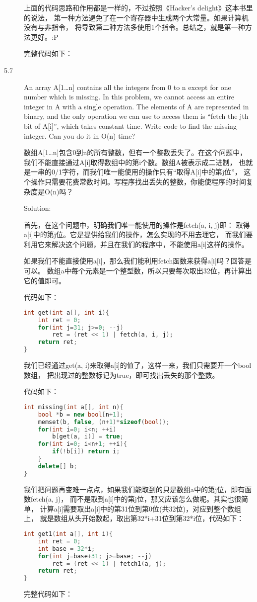 \begin{description}
上面的代码思路和作用都是一样的，不过按照《Hacker’s delight》这本书里的说法， 第一种方法避免了在一个寄存器中生成两个大常量。如果计算机没有与非指令， 将导致第二种方法多使用1个指令。总结之，就是第一种方法更好。:P

完整代码如下：



\item[5.7] An array A[1…n] contains all the integers from 0 to n except for one number which is missing. In this problem, we cannot access an entire integer in A with a single operation. The elements of A are represented in binary, and the only operation we can use to access them is “fetch the jth bit of A[i]”, which takes constant time. Write code to find the missing integer. Can you do it in O(n) time?

数组A[1…n]包含0到n的所有整数，但有一个整数丢失了。在这个问题中， 我们不能直接通过A[i]取得数组中的第i个数。数组A被表示成二进制， 也就是一串的0/1字符，而我们唯一能使用的操作只有“取得A[i]中的第j位”， 这个操作只需要花费常数时间。写程序找出丢失的整数，你能使程序的时间复杂度是O(n)吗？

Solution:

首先，在这个问题中，明确我们唯一能使用的操作是fetch(a, i, j)即： 取得a[i]中的第j位。它是提供给我们的操作，怎么实现的不用去理它， 而我们要利用它来解决这个问题，并且在我们的程序中，不能使用a[i]这样的操作。

如果我们不能直接使用a[i]，那么我们能利用fetch函数来获得a[i]吗？回答是可以。 数组a中每个元素是一个整型数，所以只要每次取出32位，再计算出它的值即可。

代码如下：
\begin{lstlisting}[language=C++]
int get(int a[], int i){
    int ret = 0;
    for(int j=31; j>=0; --j)
        ret = (ret << 1) | fetch(a, i, j);
    return ret;
}
\end{lstlisting}

我们已经通过get(a, i)来取得a[i]的值了，这样一来，我们只需要开一个bool数组， 把出现过的整数标记为true，即可找出丢失的那个整数。

代码如下：
\begin{lstlisting}[language=C++]
int missing(int a[], int n){
    bool *b = new bool[n+1];
    memset(b, false, (n+1)*sizeof(bool));
    for(int i=0; i<n; ++i)
        b[get(a, i)] = true;
    for(int i=0; i<n+1; ++i){
        if(!b[i]) return i;
    }
    delete[] b;
}
\end{lstlisting}

我们把问题再变难一点点，如果我们能取到的只是数组a中的第j位，即有函数fetch(a, j)， 而不是取到a[i]中的第j位，那又应该怎么做呢。其实也很简单， 计算a[i]需要取出a[i]中的第31位到第0位(共32位)，对应到整个数组上， 就是数组从头开始数起，取出第32*i+31位到第32*i位，代码如下：
\begin{lstlisting}[language=C++]
int get1(int a[], int i){
    int ret = 0;
    int base = 32*i;
    for(int j=base+31; j>=base; --j)
        ret = (ret << 1) | fetch1(a, j);
    return ret;
}
\end{lstlisting}
完整代码如下：



\end{description}
